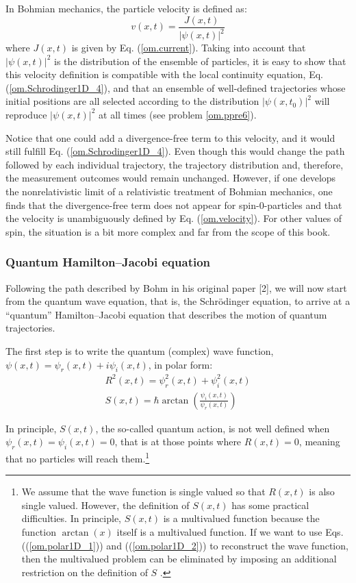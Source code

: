 \documentclass[onecolumn,nofootinbib, secnumarabic, amsmath, nobibnotes,11pt,aps,pra]{revtex4-1}
\newcommand{\pref}[1]{(\ref{#1})}
\newcommand{\eref}[1]{Eq. (\ref{#1})}
\begin{document}
In Bohmian mechanics, the particle velocity is defined as:
\begin{equation}
\label{om.velocity}
v(x,t) = \frac{J(x,t)}{|\psi(x,t)|^2}
\end{equation}
where $J(x,t)$ is given by \eref{om.current}.
Taking into account that $|\psi(x,t)|^2$ is the distribution of the ensemble of particles, it is easy to show that this velocity definition is compatible with the local continuity equation, \eref{om.Schrodinger1D_4}, and that an ensemble of well-defined trajectories whose initial positions are all selected according to the distribution $|\psi(x,t_0)|^2$ will reproduce $|\psi(x,t)|^2$ at all times (see problem \ref{om.ppre6}).

Notice that one could add a divergence-free term to this velocity, and it would still fulfill \eref{om.Schrodinger1D_4}. Even though this would change the path followed by each individual trajectory, the trajectory distribution and, therefore, the measurement outcomes would remain unchanged.
However, if one develops the nonrelativistic limit of a relativistic treatment of Bohmian mechanics, one finds that the divergence-free  term does not appear for spin-0-particles and that the velocity is unambiguously defined by \eref{om.velocity}. For other values of spin, the situation is a bit more complex \cite{om.Holland1999,om.Holland2003} and far from the scope of this book.

\subsubsection{Quantum Hamilton--Jacobi equation}\label{sec.quantum_HJ.om}

Following the path described by Bohm in his original paper  [2], we
will now start from the quantum wave equation, that is, the
Schr\"odinger equation, to arrive at a ``quantum'' Hamilton--Jacobi
equation that describes the motion of quantum trajectories.

The first step is to write the quantum (complex) wave function, $\psi(x,t) = \psi_r(x,t) + i \psi_i(x,t)$, in polar form:
\begin{eqnarray}
R^2(x,t) = \psi_{r}^2(x,t) + \psi_{i}^2(x,t) \label{om.polar1D_1} \\
S(x,t) = \hbar \arctan \left(\frac {\psi_{i}(x,t)} {\psi_{r}(x,t)} \right)
\label{om.polar1D_2}
\end{eqnarray}

In principle, $S(x,t)$, the so-called quantum action, is not well defined when $\psi_r(x,t) =
\psi_i(x,t) = 0$, that is  at those points where $R(x,t) = 0$, meaning that no
particles will reach them.\footnote{We assume that the wave function
is single valued so that $R(x,t)$ is also single valued. However,
the definition of $S(x,t)$ has some practical difficulties. In
principle, $S(x,t)$ is a multivalued function because the function
$\arctan(x)$ itself is a multivalued function. If we want to use
Eqs. (\pref{om.polar1D_1}) and (\pref{om.polar1D_2}) to reconstruct
the wave function, then the multivalued problem can be eliminated by
imposing an  additional restriction on the definition of
$S$ \cite{om.Holand1993,om.Bohm1993,om.Durrllibre}.}
\end{document}
